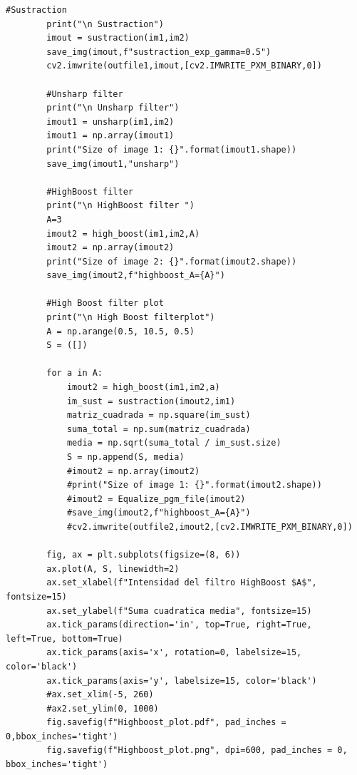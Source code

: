 \documentclass[11pt,twocolumn,twoside]{opticajnl}
\begin{document}
\begin{onecolumn}
\begin{lstlisting}[style=mystyle]
        #Sustraction
        print("\n Sustraction")
        imout = sustraction(im1,im2)
        save_img(imout,f"sustraction_exp_gamma=0.5")
        cv2.imwrite(outfile1,imout,[cv2.IMWRITE_PXM_BINARY,0])
    
        #Unsharp filter
        print("\n Unsharp filter")
        imout1 = unsharp(im1,im2)
        imout1 = np.array(imout1)
        print("Size of image 1: {}".format(imout1.shape))
        save_img(imout1,"unsharp")
    
        #HighBoost filter
        print("\n HighBoost filter ")
        A=3
        imout2 = high_boost(im1,im2,A)
        imout2 = np.array(imout2)
        print("Size of image 2: {}".format(imout2.shape))
        save_img(imout2,f"highboost_A={A}")
    
        #High Boost filter plot
        print("\n High Boost filterplot")
        A = np.arange(0.5, 10.5, 0.5)
        S = ([])
    
        for a in A:
            imout2 = high_boost(im1,im2,a)
            im_sust = sustraction(imout2,im1)
            matriz_cuadrada = np.square(im_sust)
            suma_total = np.sum(matriz_cuadrada)
            media = np.sqrt(suma_total / im_sust.size)
            S = np.append(S, media)
            #imout2 = np.array(imout2)
            #print("Size of image 1: {}".format(imout2.shape))
            #imout2 = Equalize_pgm_file(imout2)
            #save_img(imout2,f"highboost_A={A}")
            #cv2.imwrite(outfile2,imout2,[cv2.IMWRITE_PXM_BINARY,0])
        
        fig, ax = plt.subplots(figsize=(8, 6))
        ax.plot(A, S, linewidth=2)
        ax.set_xlabel(f"Intensidad del filtro HighBoost $A$", fontsize=15)
        ax.set_ylabel(f"Suma cuadratica media", fontsize=15)
        ax.tick_params(direction='in', top=True, right=True, left=True, bottom=True)
        ax.tick_params(axis='x', rotation=0, labelsize=15, color='black')
        ax.tick_params(axis='y', labelsize=15, color='black')
        #ax.set_xlim(-5, 260)
        #ax2.set_ylim(0, 1000)
        fig.savefig(f"Highboost_plot.pdf", pad_inches = 0,bbox_inches='tight')
        fig.savefig(f"Highboost_plot.png", dpi=600, pad_inches = 0, bbox_inches='tight')
\end{lstlisting}
\end{onecolumn}
\end{document}
